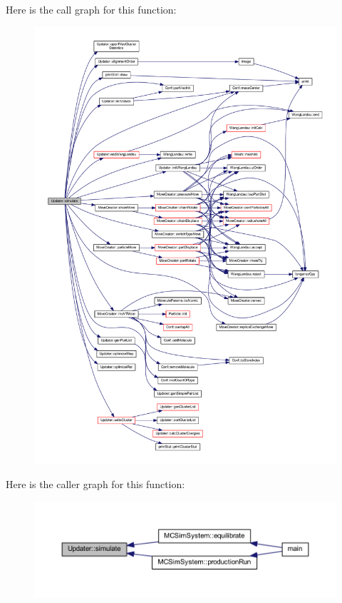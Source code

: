 Here is the call graph for this function\+:
\nopagebreak
\begin{figure}[H]
\begin{center}
\leavevmode
\includegraphics[width=350pt]{class_updater_a42cde2ba4af4b35d0265a183a42cea20_cgraph}
\end{center}
\end{figure}




Here is the caller graph for this function\+:\nopagebreak
\begin{figure}[H]
\begin{center}
\leavevmode
\includegraphics[width=350pt]{class_updater_a42cde2ba4af4b35d0265a183a42cea20_icgraph}
\end{center}
\end{figure}


